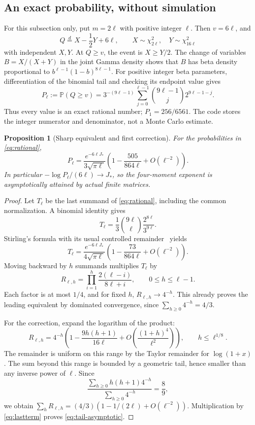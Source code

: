 \documentclass[11pt,letterpaper]{article}
\numberwithin{equation}{section}
\newtheorem{proposition}[theorem]{Proposition}
\theoremstyle{definition}\newtheorem{definition}[theorem]{Definition}
\theoremstyle{remark}\newtheorem{remark}[theorem]{Remark}
\newcommand{\PP}{\mathbb P}
\begin{document}
\subsection{An exact probability, without simulation}
For this subsection only, put $m=2\ell$ with positive integer $\ell$.
Then $v=6\ell$, and
\[
 Q\overset d=X-\frac12Y+6\ell,
 \qquad X\sim\chi^2_{2\ell},\quad Y\sim\chi^2_{16\ell}
\]
with independent $X,Y$. At $Q\ge v$, the event is $X\ge Y/2$.
The change of variables $B=X/(X+Y)$ in the joint Gamma density shows
that $B$ has beta density proportional to $b^{\ell-1}(1-b)^{8\ell-1}$.
For positive integer beta parameters, differentiation of the binomial
tail and checking its endpoint value gives
\begin{equation}\label{eq:rational}
 P_\ell:=\PP(Q\ge v)
 =3^{-(9\ell-1)}\sum_{j=0}^{\ell-1}
       \binom{9\ell-1}{j}2^{9\ell-1-j}.
\end{equation}
Thus every value is an exact rational number; $P_1=256/6561$.
The code stores the integer numerator and denominator, not a Monte
Carlo estimate.

\begin{proposition}[Sharp equivalent and first correction]
\label{prop:asymptotic}
For the probabilities in \eqref{eq:rational},
\begin{equation}\label{eq:tail-asymptotic}
 P_\ell=
 \frac{e^{-6\ell J_*}}{3\sqrt{\pi\ell}}
 \left(1-\frac{505}{864\ell}+O(\ell^{-2})\right).
\end{equation}
In particular $-\log P_\ell/(6\ell)\to J_*$, so the four-moment
exponent is asymptotically attained by actual finite matrices.
\end{proposition}
\begin{proof}
Let $T_\ell$ be the last summand of \eqref{eq:rational}, including the
common normalization. A binomial identity gives
\[
 T_\ell=\frac13\binom{9\ell}{\ell}
                  \frac{2^{8\ell}}{3^{9\ell}}.
\]
Stirling's formula with its usual controlled remainder~\cite{DLMF}
yields
\begin{equation}\label{eq:lastterm}
 T_\ell=\frac{e^{-6\ell J_*}}{4\sqrt{\pi\ell}}
       \left(1-\frac{73}{864\ell}+O(\ell^{-2})\right).
\end{equation}
Moving backward by $h$ summands multiplies $T_\ell$ by
\[
 R_{\ell,h}=\prod_{i=1}^{h}\frac{2(\ell-i)}{8\ell+i},
 \qquad0\le h\le\ell-1.
\]
Each factor is at most $1/4$, and for fixed $h$,
$R_{\ell,h}\to4^{-h}$. This already proves the leading equivalent
by dominated convergence, since $\sum_{h\ge0}4^{-h}=4/3$.

For the correction, expand the logarithm of the product:
\[
 R_{\ell,h}=4^{-h}
 \left(1-\frac{9h(h+1)}{16\ell}
 +O\left(\frac{(1+h)^4}{\ell^2}\right)\right),
 \qquad h\le\ell^{1/8}.
\]
The remainder is uniform on this range by the Taylor remainder for
$\log(1+x)$. The sum beyond this range is bounded by a geometric
tail, hence smaller than any inverse power of $\ell$. Since
\[
 \frac{\sum_{h\ge0}h(h+1)4^{-h}}{\sum_{h\ge0}4^{-h}}=\frac89,
\]
we obtain
$\sum_hR_{\ell,h}=(4/3)(1-1/(2\ell)+O(\ell^{-2}))$.
Multiplication by \eqref{eq:lastterm} proves
\eqref{eq:tail-asymptotic}.
\end{proof}
\end{document}
